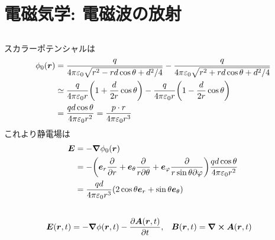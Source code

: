 \documentclass[../../sp_2017.tex]{subfiles}
\begin{document}
\setcounter{section}{2}
\section{電磁気学: 電磁波の放射}
\subsection{}
スカラーポテンシャルは
\begin{equation}\begin{aligned}[b]
    \phi_0(\vb*{r})
    &=\frac{q}{4\pi\varepsilon_0\sqrt{r^2-rd\cos\theta +d^2/4}}-\frac{q}{4\pi\varepsilon_0\sqrt{r^2+rd\cos\theta +d^2/4}}\\
    &\simeq\frac{q}{4\pi\varepsilon_0 r}\qty(1+\frac{d}{2r}\cos\theta)-\frac{q}{4\pi\varepsilon_0r}\qty(1-\frac{d}{2r}\cos\theta)\\
    &= \frac{qd\cos\theta}{4\pi\varepsilon_0 r^2}
    =\frac{p\cdot r}{4\pi\varepsilon_0 r^3}
\end{aligned}\end{equation}
これより静電場は
\begin{equation}\begin{aligned}[b]
    \vb*{E} &= -\grad \phi_0(\vb*{r}) \\
    &=-\qty(\vb*{e}_r\pdv{r}+\vb*{e}_\theta\frac{\partial}{r\partial\theta}+\vb*{e}_\varphi\frac{\partial}{r\sin\theta\partial\varphi})
    \frac{qd\cos\theta}{4\pi\varepsilon_0 r^2}\\
    &= \frac{qd}{4\pi\varepsilon_0r^3}\qty(2\cos\theta\vb*{e}_r+\sin\theta\vb*{e}_\theta)
\end{aligned}\end{equation}


\subsection{}
\begin{equation}\begin{aligned}[b]
    \vb*{E}(\vb*{r},t) &= -\grad\phi(\vb*{r},t)-\pdv{\vb*{A}(\vb*{r},t)}{t}, & \vb*{B}(\vb*{r},t) &= \curl \vb*{A}(\vb*{r},t)
\end{aligned}\end{equation}
\end{document}

